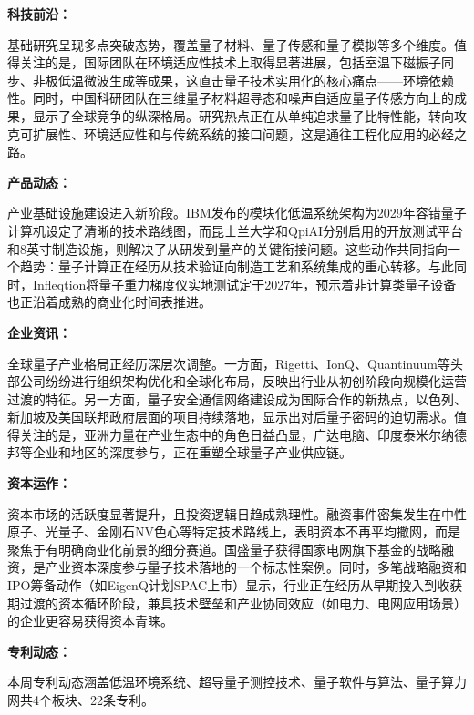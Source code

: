 \documentclass[12pt,a4paper]{ctexart}
\begin{document}
\textbf{ 科技前沿：}

基础研究呈现多点突破态势，覆盖量子材料、量子传感和量子模拟等多个维度。值得关注的是，国际团队在环境适应性技术上取得显著进展，包括室温下磁振子同步、非极低温微波生成等成果，这直击量子技术实用化的核心痛点——环境依赖性。同时，中国科研团队在三维量子材料超导态和噪声自适应量子传感方向上的成果，显示了全球竞争的纵深格局。研究热点正在从单纯追求量子比特性能，转向攻克可扩展性、环境适应性和与传统系统的接口问题，这是通往工程化应用的必经之路。


\textbf{ 产品动态：}

产业基础设施建设进入新阶段。IBM发布的模块化低温系统架构为2029年容错量子计算机设定了清晰的技术路线图，而昆士兰大学和QpiAI分别启用的开放测试平台和8英寸制造设施，则解决了从研发到量产的关键衔接问题。这些动作共同指向一个趋势：量子计算正在经历从技术验证向制造工艺和系统集成的重心转移。与此同时，Infleqtion将量子重力梯度仪实地测试定于2027年，预示着非计算类量子设备也正沿着成熟的商业化时间表推进。


\textbf{ 企业资讯：}

全球量子产业格局正经历深层次调整。一方面，Rigetti、IonQ、Quantinuum等头部公司纷纷进行组织架构优化和全球化布局，反映出行业从初创阶段向规模化运营过渡的特征。另一方面，量子安全通信网络建设成为国际合作的新热点，以色列、新加坡及美国联邦政府层面的项目持续落地，显示出对后量子密码的迫切需求。值得关注的是，亚洲力量在产业生态中的角色日益凸显，广达电脑、印度泰米尔纳德邦等企业和地区的深度参与，正在重塑全球量子产业供应链。


\textbf{ 资本运作：}

资本市场的活跃度显著提升，且投资逻辑日趋成熟理性。融资事件密集发生在中性原子、光量子、金刚石NV色心等特定技术路线上，表明资本不再平均撒网，而是聚焦于有明确商业化前景的细分赛道。国盛量子获得国家电网旗下基金的战略融资，是产业资本深度参与量子技术落地的一个标志性案例。同时，多笔战略融资和IPO筹备动作（如EigenQ计划SPAC上市）显示，行业正在经历从早期投入到收获期过渡的资本循环阶段，兼具技术壁垒和产业协同效应（如电力、电网应用场景）的企业更容易获得资本青睐。




\textbf{ 专利动态：}

本周专利动态涵盖低温环境系统、超导量子测控技术、量子软件与算法、量子算力网共4个板块、22条专利。
\end{document}

